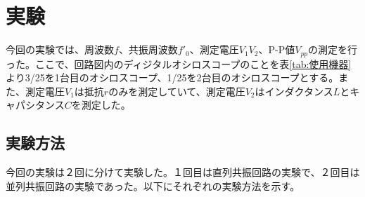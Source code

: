 \documentclass[12pt,a4paper]{jsarticle}
\numberwithin{equation}{section}
\numberwithin{figure}{section}
\numberwithin{table}{section}
\begin{document}
  \newpage
  \section{実験}
  今回の実験では、周波数$f$、共振周波数$f'_0$、測定電圧$V_1V_2$、P-P値$V_{pp}$の測定を行った。ここで、回路図内のディジタルオシロスコープのことを表\ref{tab:使用機器}より3/25を1台目のオシロスコープ、1/25を2台目のオシロスコープとする。また、測定電圧$V_1$は抵抗$r$のみを測定していて、測定電圧$V_2$はインダクタンス$L$とキャパシタンス$C$を測定した。

  \subsection{実験方法}
  今回の実験は２回に分けて実験した。１回目は直列共振回路の実験で、２回目は並列共振回路の実験であった。以下にそれぞれの実験方法を示す。
\end{document}
